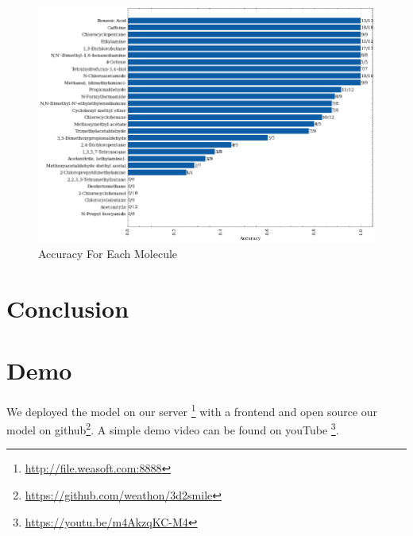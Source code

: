 \documentclass[12pt]{article}
\begin{document}
\begin{figure}[t]
    \centering
    \includegraphics[width=0.8\linewidth]{image.png}
    \caption{Accuracy For Each Molecule}
    \label{fig:acc_each}
\end{figure}
\section{Conclusion}
\section{Demo}
We deployed the model on our server \footnote{\url{http://file.weasoft.com:8888}} with a frontend and open source our model on github\footnote{\url{https://github.com/weathon/3d2smile}}. A simple demo video can be found on youTube \footnote{\url{https://youtu.be/m4AkzqKC-M4}}. 
\end{document}
